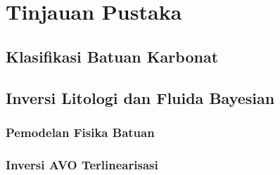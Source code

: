 \documentclass[main.tex]{subfiles}
\begin{document}
\chapter{Tinjauan Pustaka}

\section{Klasifikasi Batuan Karbonat}

\lipsum

\section{Inversi Litologi dan Fluida Bayesian}
\subsection{Pemodelan Fisika Batuan}
\subsection{Inversi AVO Terlinearisasi}
\end{document}
